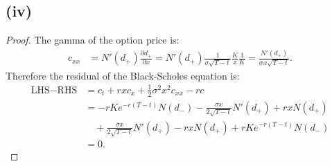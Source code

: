 \documentclass[final,3p,authoryear]{elsarticle}
\begin{document}
	\subsection{(iv)}
		\begin{proof}
			The gamma of the option price is:
			\begin{align}
				c_{xx} &= N'(d_+) \frac{\partial d_+}{\partial x} = N'(d_+) \frac{1}{\sigma \sqrt{T-t}} \frac{K}{x} \frac{1}{K} = \frac{N'(d_+)}{\sigma x \sqrt{T-t}}
				.
			\end{align}
			Therefore the residual of the Black-Scholes equation is:
			\begin{align}
				\text{LHS}-\text{RHS} &= c_t + rxc_x + \frac{1}{2}\sigma^2 x^2 c_{xx} - r c
				\nonumber\\
				&= - r K e^{-r\left(T-t\right)} N(d_-) - \frac{\sigma x}{2\sqrt{T-t}} N'(d_+) + r x N(d_+)
				\nonumber\\
				&\quad + \frac{\sigma x}{2\sqrt{T-t}} N'(d_+) - r x N(d_+) + r K e^{-r\left(T-t\right)} N(d_-)
				\nonumber\\
				&= 0
				.
			\end{align}
		\end{proof}
		
\end{document}
